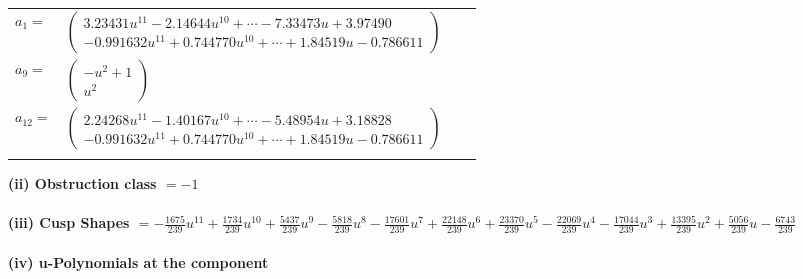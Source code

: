 \documentclass[1p]{elsarticle_modified}
\theoremstyle{definition}
\begin{document}
\begin{tabular}{m{7pt} m{180pt} m{7pt} m{180pt} }
\flushright $a_{1}=$&$\begin{pmatrix}3.23431 u^{11}-2.14644 u^{10}+\cdots-7.33473 u+3.97490\\-0.991632 u^{11}+0.744770 u^{10}+\cdots+1.84519 u-0.786611\end{pmatrix}$ \\
\flushright $a_{9}=$&$\begin{pmatrix}- u^2+1\\u^2\end{pmatrix}$ \\
\flushright $a_{12}=$&$\begin{pmatrix}2.24268 u^{11}-1.40167 u^{10}+\cdots-5.48954 u+3.18828\\-0.991632 u^{11}+0.744770 u^{10}+\cdots+1.84519 u-0.786611\end{pmatrix}$\\&\end{tabular}
\flushleft \textbf{(ii) Obstruction class $= -1$}\\~\\
\flushleft \textbf{(iii) Cusp Shapes $= -\frac{1675}{239} u^{11}+\frac{1734}{239} u^{10}+\frac{5437}{239} u^9-\frac{5818}{239} u^8-\frac{17601}{239} u^7+\frac{22148}{239} u^6+\frac{23370}{239} u^5-\frac{22069}{239} u^4-\frac{17044}{239} u^3+\frac{13395}{239} u^2+\frac{5056}{239} u-\frac{6743}{239}$}\\~\\
\newpage\renewcommand{\arraystretch}{1}
\flushleft \textbf{(iv) u-Polynomials at the component}\newline \\
\end{document}
